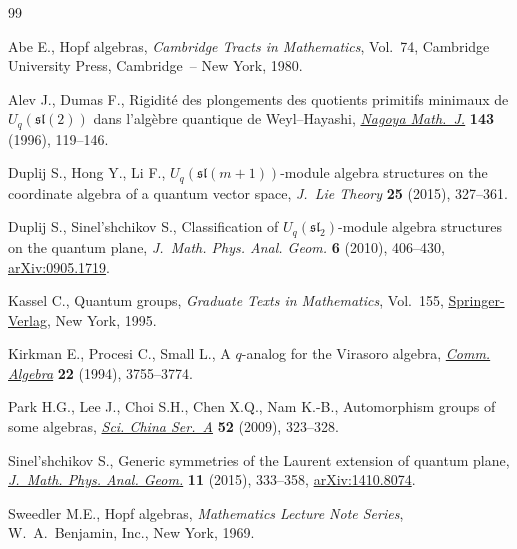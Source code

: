 \begin{thebibliography}{99}
\footnotesize\itemsep=0pt

Abe E., Hopf algebras, \textit{Cambridge Tracts in Mathematics}, Vol.~74,
 Cambridge University Press, Cambridge~-- New York, 1980.

Alev J., Dumas F., Rigidit\'{e} des plongements des quotients primitifs
 minimaux de {$U_q(\mathfrak{sl}(2))$} dans l'alg\`ebre quantique de
 {W}eyl--{H}ayashi, \href{https://doi.org/10.1017/S002776300000595X}{\textit{Nagoya Math.~J.}} \textbf{143} (1996), 119--146.

Duplij S., Hong Y., Li F., {$U_q(\mathfrak{sl}(m+1))$}-module algebra
 structures on the coordinate algebra of a quantum vector space,
 \textit{J.~Lie Theory} \textbf{25} (2015), 327--361.

Duplij S., Sinel'shchikov S., Classification of {$U_q(\mathfrak{sl}_2)$}-module
 algebra structures on the quantum plane, \textit{J.~Math. Phys. Anal. Geom.}
 \textbf{6} (2010), 406--430, \href{http://arxiv.org/abs/0905.1719}{arXiv:0905.1719}.

Kassel C., Quantum groups, \textit{Graduate Texts in Mathematics}, Vol.~155,
 \href{https://doi.org/10.1007/978-1-4612-0783-2}{Springer-Verlag}, New York, 1995.

Kirkman E., Procesi C., Small L., A {$q$}-analog for the {V}irasoro algebra,
 \href{https://doi.org/10.1080/00927879408825052}{\textit{Comm. Algebra}} \textbf{22} (1994), 3755--3774.

Park H.G., Lee J., Choi S.H., Chen X.Q., Nam K.-B., Automorphism groups of some
 algebras, \href{https://doi.org/10.1007/s11425-009-0007-9}{\textit{Sci. China Ser.~A}} \textbf{52} (2009), 323--328.

Sinel'shchikov S., Generic symmetries of the {L}aurent extension of quantum
 plane, \href{https://doi.org/10.15407/mag11.04.333}{\textit{J.~Math. Phys. Anal. Geom.}} \textbf{11} (2015), 333--358,
 \href{http://arxiv.org/abs/1410.8074}{arXiv:1410.8074}.

Sweedler M.E., Hopf algebras, \textit{Mathematics Lecture Note Series}, W.~A.~Benjamin,
 Inc., New York, 1969.

\end{thebibliography}\LastPageEnding
